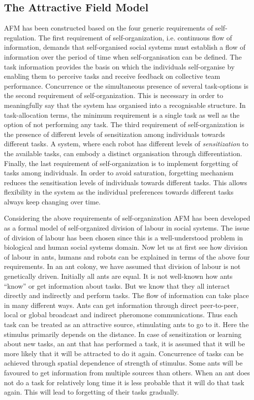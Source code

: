 \documentclass[smallcondensed]{svjour3}
\begin{document}
\subsection{The Attractive Field Model}
\label{afm:framework}
AFM has been constructed based on the four generic requirements of self-regulation. The first requirement of  self-organization, i.e. continuous flow of information, demands that self-organised social systems must establish a flow of information over the period of time when self-organisation can be defined. The task information provides the basis on which the individuals self-organise by enabling them to perceive tasks and receive feedback on collective team performance.  Concurrence or the simultaneous presence of several task-options is the second requirement of  self-organization. This is necessary in order to meaningfully say that the system has organised into a recognisable structure. In task-allocation terms, the minimum requirement is a single task as well as the option of not performing any task. The third requirement of self-organization is the presence of different levels of sensitization among individuals towards different tasks. A system, where each robot has different levels of {\em sensitization} to the available tasks, can  embody a distinct organisation through differentiation. Finally, the last requirement of self-organization is to implement forgetting of tasks among individuals. In order to avoid saturation, forgetting mechanism reduces the sensitisation levels of individuals towards different tasks. This allows flexibility in the system as the individual preferences towards different tasks always keep changing over time. 

Considering the above requirements of self-organization AFM has been developed as a formal model of self-organized division of labour in social systems. The issue of division of labour has been chosen since this is a well-understood problem in biological and human social systems domain. Now let us at first see how division of labour in ants, humans and robots can be explained in terms of the above four requirements. In an ant colony, we have assumed that division of labour is not genetically driven. Initially all ants are equal. It is not well-known how ants ``know'' or get information about tasks. But we know that they all interact directly and indirectly and perform tasks. The flow of information can take place in many different ways. Ants can get information through direct peer-to-peer, local or global broadcast and indirect pheromone communications. Thus each task can be treated as an attractive source, stimulating ants to go to it. Here the stimulus primarily depends on the distance. In case of sensitization or learning about new tasks, an ant that has performed a task, it is assumed that it will be more likely that it will be attracted to do it again.  Concurrence of tasks  can  be achieved through spatial dependence of strength of stimulus. Some ants will be favoured to get information from multiple sources than others. When an ant does not do a task for relatively long time it is less probable that it will do that task again. This will lead to forgetting of their tasks gradually.  
\end{document}
